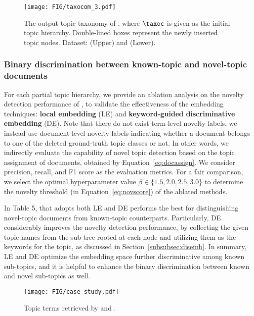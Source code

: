 \begin{figure*}[t]
    \centering
    \texttt{[image: FIG/taxocom\_3.pdf]}
    \caption{The output topic taxonomy of \proposed, where $\taxoc$ is given as the initial topic hierarchy. Double-lined boxes represent the newly inserted topic nodes. Dataset: \nyt (Upper) and \arxiv (Lower).}
    \label{fig:outputtaxo}
\end{figure*}

\subsubsection{Binary discrimination between known-topic and novel-topic documents}
\label{subsubsec:noveltyeval}
For each partial topic hierarchy, we provide an ablation analysis on the novelty detection performance of \proposed, to validate the effectiveness of the embedding techniques:
\textbf{local embedding} (LE) and \textbf{keyword-guided discriminative embedding} (DE).
Note that there do not exist term-level novelty labels, we instead use document-level novelty labels indicating whether a document belongs to one of the deleted ground-truth topic classes or not.
In other words, we indirectly evaluate the capability of novel topic detection based on the topic assignment of documents, obtained by Equation~\eqref{eq:docassign}.
We consider precision, recall, and F1 score as the evaluation metrics.
For a fair comparison, we select the optimal hyperparameter value $\beta\in\{1.5, 2.0, 2.5, 3.0\}$ to determine the novelty threshold (in Equation~\eqref{eq:novscore}) of the ablated methods.

In Table 5, \proposed that adopts both LE and DE performs the best for distinguishing novel-topic documents from known-topic counterparts.
Particularly, DE considerably improves the novelty detection performance, by collecting the given topic names from the sub-tree rooted at each node and utilizing them as the keywords for the topic, as discussed in Section~\ref{subsubsec:disemb}.
In summary, LE and DE optimize the embedding space further discriminative among known sub-topics, and it is helpful to enhance the binary discrimination between known and novel sub-topics as well.

\begin{figure}[t]
    \centering
    \texttt{[image: FIG/case\_study.pdf]}
    \caption{Topic terms retrieved by \corel and \proposed.}
    \label{fig:casestudy}
\end{figure}

